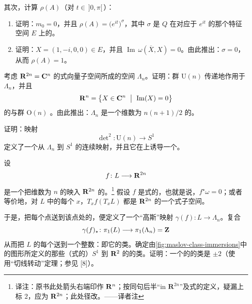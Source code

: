 \begin{exercise}
其次，计算 $\rho(A)$（对 $t\in\,]0,\pi[\,$）：
\begin{enumerate}[label=(\arabic*)]
\item 证明：$m_0=0$，并且 $\rho(A)=\bigl(e^{it}\bigr)^{\sigma}$，其中 $\sigma$ 是 $Q$ 在对应于\trEigenvalue{} $e^{it}$ 的那个特征空间 $E$ 上的\trSignature。
\item 证明：$X=(1,-i,0,0)\in E$，并且 $\operatorname{Im}\,\omega(\overline{X},X)=0$。由此推出：$\sigma=0$，从而 $\rho(A)=1$。
\end{enumerate}
\end{exercise}

\begin{exercise}[\trLagrange{}\trGrassmann\trManifold]\label{ex:ch14-040-lagrangian-grassmannian}
考虑 $\mathbf{R}^{2n}=\mathbf{C}^{n}$ 的\trLagrange{}式向量子空间所成的空间 $\Lambda_n$。证明：群 $\mathrm{U}(n)$ 传递地作用于 $\Lambda_n$，并且
\[
\RR^{n}=\bigl\{X\in\CC^{n}\ \bigm|\ \operatorname{Im}(X)=0\bigr\}
\]
的\trStabilizer{}与\trOrthogonal{}群 $\mathrm{O}(n)$ \trIsomorphic。由此推出：$\Lambda_n$ 是一个维数为 $n(n+1)/2$ 的\trConnected\trCompact\trManifold。

证明：映射
\[
\det\nolimits^{2}\colon\mathrm{U}(n)\longrightarrow S^{1}
\]
定义了一个从 $\Lambda_n$ 到 $S^{1}$ 的连续映射，并且它在\trFundamentalGroup{}上诱导一个\trIsomorphism。
\end{exercise}

\begin{exercise}\label{ex:ch14-041-maslov-class-immersion}
设
\[
f\colon L\longrightarrow\mathbf{R}^{2n}
\]
是一个把维数为 $n$ 的\trManifold{}映入 $\mathbf{R}^{2n}$ 的\trImmersion。\footnote{译注：原书此处箭头右端印作 $\mathbf{R}^{n}$；按同句后半“in $\mathbf{R}^{2n}$”及\trLagrange{}式\trImmersion{}的定义，疑漏上标 $2$，应为 $\mathbf{R}^{2n}$；此处径改。——译者注}
假设 $f$ 是\trLagrange{}式的，也就是说，$f^\star\omega=0$；或者等价地，对 $L$ 中的每个 $x$，$T_xf(T_xL)$ 都是 $\mathbf{R}^{2n}$ 的一个\trLagrange{}式子空间。

于是，把每个点送到该点处的\trTangentSpace，便定义了一个“高斯”映射 $\gamma(f)\colon L\to\Lambda_n$。复合
\[
\gamma(f)_\star\colon\pi_1(L)\longrightarrow\pi_1(\Lambda_n)=\mathbf{Z}
\]
从而把 $L$ 的每个\trLoop{}送到一个整数：即它的\trMaslov{}类。确定由\cref{fig:maslov-class-immersions}中的图形所定义的那些（\trLagrange{}式的）$S^{1}$ 到 $\mathbf{R}^{2}$ 的\trImmersion{}的\trMaslov{}类。证明：一个\trEmbedding{}的\trCircle{}的\trMaslov{}类是 $\pm2$（使用“切线转动”定理；参见 [8]）。
\end{exercise}

